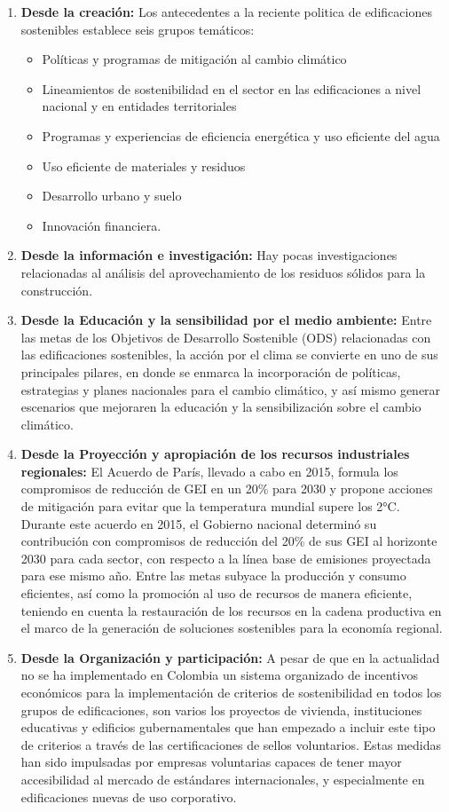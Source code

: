 \documentclass[12pt]{article}
\begin{document}
\begin{enumerate}
\item\textbf{Desde la creación:} Los antecedentes a la reciente politica de edificaciones sostenibles establece seis grupos temáticos:
\begin{itemize}
\item Políticas y programas de mitigación al cambio climático
\item Lineamientos de sostenibilidad en el sector en las edificaciones a nivel nacional y en entidades territoriales
\item Programas y experiencias de eficiencia energética y uso eficiente del agua
\item Uso eficiente de materiales y residuos
\item Desarrollo urbano y suelo
\item Innovación financiera.
\end{itemize}
\item \textbf{Desde la información e investigación:} Hay pocas investigaciones relacionadas al análisis del aprovechamiento de los residuos sólidos para la construcción.
\item \textbf{Desde la Educación y la sensibilidad por el medio ambiente:} Entre las metas de los Objetivos de Desarrollo Sostenible  (ODS) relacionadas con las edificaciones sostenibles, la acción por el clima se convierte en uno de sus principales pilares, en donde se enmarca la incorporación de políticas, estrategias y planes nacionales para el cambio climático, y así mismo generar escenarios que mejoraren la educación y la sensibilización sobre el cambio climático. 
\item \textbf{Desde la Proyección y apropiación de los recursos industriales regionales:}
El Acuerdo de París, llevado a cabo en 2015, formula los compromisos de reducción de GEI en un 20\% para 2030 y propone acciones de mitigación para evitar que la temperatura mundial supere los 2°C. Durante este acuerdo en 2015, el Gobierno nacional determinó su contribución con compromisos de reducción del 20\% de sus GEI al horizonte 2030 para cada sector, con respecto a la línea base de emisiones proyectada para ese mismo año. Entre las metas subyace la producción y consumo eficientes, así como la promoción al uso de recursos de manera eficiente, teniendo en cuenta la restauración de los recursos en la cadena productiva en el marco de la generación de soluciones sostenibles para la economía regional.
\item \textbf{Desde la Organización y participación:} A pesar de que en la actualidad no se ha implementado en Colombia un sistema organizado de incentivos económicos para la implementación de criterios de sostenibilidad en todos los grupos de edificaciones, son varios los proyectos de vivienda, instituciones educativas y edificios gubernamentales que han empezado a incluir este tipo de criterios a través de las certificaciones de sellos voluntarios. Estas medidas han sido impulsadas por empresas voluntarias capaces de tener mayor accesibilidad al mercado de estándares internacionales, y especialmente en edificaciones nuevas de uso corporativo.
\end{enumerate}
\end{document}
